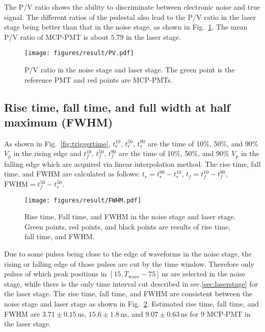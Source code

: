 The P/V ratio shows the ability to discriminate between electronic noise and true signal. The different ratios of the pedestal also lead to the P/V ratio in the laser stage being better than that in the noise stage, as shown in Fig.~\ref{fig:PVCompare}. The mean P/V ratio of MCP-PMT is about $5.79$ in the laser stage.
\begin{figure}[!htbp]
    \centering
    \texttt{[image: figures/result/PV.pdf]}
    \caption{P/V ratio in the noise stage and laser stage. The green point is the reference PMT and red points are MCP-PMTs.} 
    \label{fig:PVCompare}
\end{figure}

\subsection{Rise time, fall time, and full width at half maximum (FWHM)}
As shown in Fig.~\ref{fig:triggertime}, $t^{10}_r$, $t^{50}_r$, $t^{90}_r$ are the time of 10\%, 50\%, and 90\% $V_p$ in the rising edge and $t^{10}_f$, $t^{50}_f$, $t^{90}_f$ are the time of 10\%, 50\%, and 90\% $V_p$ in the falling edge which are acquired via linear interpolation method. The rise time, fall time, and FWHM are calculated as follows: $t_r = t^{90}_r - t^{10}_r$, $t_f = t^{10}_f - t^{90}_f$, $\mathrm{FWHM} = t^{50}_f - t^{50}_r$.

\begin{figure}[!htbp]
    \centering
    \texttt{[image: figures/result/FWHM.pdf]}
    \caption{Rise time, Fall time, and FWHM in the noise stage and laser stage. Green points, red points, and black points are results of rise time, fall time, and FWHM.}
    \label{fig:RiseCompare}
\end{figure}
Due to some pulses being close to the edge of waveforms in the noise stage, the rising or falling edge of those pulses are cut by the time window. Therefore only pulses of which peak positions in $[15, T_{\mathrm{wave}}-75]$\,ns are selected in the noise stage, while there is the only time interval cut described in sec.\ref{sec:laserstage} for the laser stage.
 The rise time, fall time, and FWHM are consistent between the noise stage and laser stage as shown in Fig.~\ref{fig:RiseCompare}. Estimated rise time, fall time, and FWHM are $3.71\pm0.15$\,ns, $15.6\pm1.8$\,ns, and $9.07\pm0.63$\,ns for 9 MCP-PMT in the laser stage.

